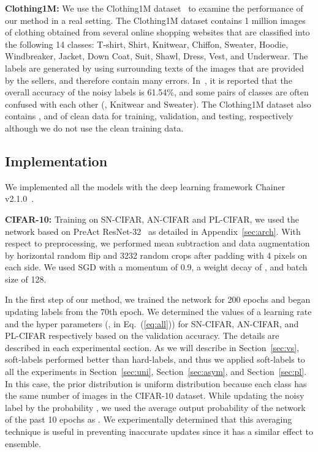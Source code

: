 \documentclass[10pt,twocolumn,letterpaper]{article}
\newcommand{\Eref}[1]{Eq.~(\ref{#1})}
\newcommand{\Sref}[1]{Section~\ref{#1}}
\newcommand{\APref}[1]{Appendix~\ref{#1}}
\begin{document}
\vspace{2mm}\noindent\textbf{Clothing1M:}
We use the Clothing1M dataset~\cite{xiao2015learning} to examine the performance of our method in a real setting.
The Clothing1M dataset contains 1 million images of clothing obtained from several online shopping websites that are classified into the following 14 classes: T-shirt, Shirt, Knitwear, Chiffon, Sweater, Hoodie, Windbreaker, Jacket, Down Coat, Suit, Shawl, Dress, Vest, and Underwear.
The labels are generated by using surrounding texts of the images that are provided by the sellers, and therefore contain many errors.
In~\cite{xiao2015learning}, it is reported that the overall accuracy of the noisy labels is 61.54\%, and some pairs of classes are often confused with each other (\eg, Knitwear and Sweater).
The Clothing1M dataset also contains ,  and  of clean data for training, validation, and testing, respectively although we do not use the  clean training data.

\subsection{Implementation}
We implemented all the models with the deep learning framework Chainer v2.1.0~\cite{tokui2015chainer}.

\vspace{2mm}\noindent\textbf{CIFAR-10:}
Training on SN-CIFAR, AN-CIFAR and PL-CIFAR, we used the network based on PreAct ResNet-32~\cite{he2016identity} as detailed in \APref{sec:arch}.
With respect to preprocessing, we performed mean subtraction and data augmentation by horizontal random flip and 3232 random crops after padding with 4 pixels on each side. We used SGD with a momentum of 0.9, a weight decay of , and batch size of 128.

In the first step of our method, we trained the network for 200 epochs and began updating labels from the 70th epoch. We determined the values of a learning rate and the hyper parameters (,  in \Eref{eq:all}) for SN-CIFAR, AN-CIFAR, and PL-CIFAR respectively based on the validation accuracy. The details are described in each experimental section. As we will describe in \Sref{sec:vs}, soft-labels performed better than hard-labels, and thus we applied soft-labels to all the experiments in \Sref{sec:uni}, \Sref{sec:asym}, and \Sref{sec:pl}.
In this case, the prior distribution  is uniform distribution because each class has the same number of images in the CIFAR-10 dataset.
While updating the noisy label  by the probability , we used the average output probability of the network of the past 10 epochs as . We experimentally determined that this averaging technique is useful in preventing inaccurate updates since it has a similar effect to ensemble.
\end{document}
